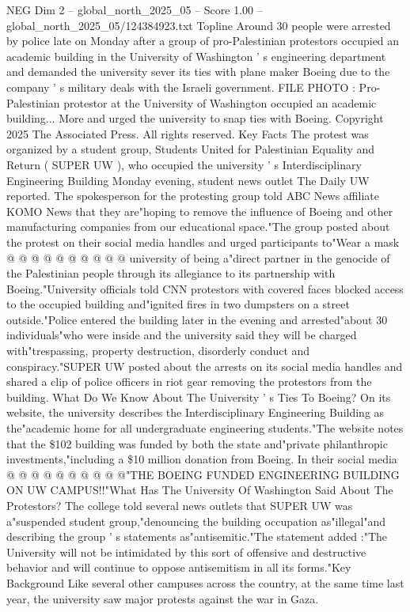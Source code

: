 \begin{textsample}{NEG Dim 2 – global\_north\_2025\_05 – Score 1.00 – global\_north\_2025\_05/124384923.txt}  \label{ex:f2_neg_237}
Topline Around 30 people were arrested by police late on Monday after a group of pro-Palestinian protestors occupied an academic building in the University of Washington ' s engineering department and demanded the university sever its ties with plane maker Boeing due to the company ' s military deals with the Israeli government.
FILE PHOTO : Pro-Palestinian protestor at the University of Washington occupied an academic building...
More and urged the university to snap ties with Boeing.
Copyright 2025 The Associated Press.
All rights reserved.
Key Facts The protest was organized by a student group, Students United for Palestinian Equality and Return ( SUPER UW ), who occupied the university ' s Interdisciplinary Engineering Building Monday evening, student news outlet The Daily UW reported.
The spokesperson for the protesting group told ABC News affiliate KOMO News that they are"hoping to remove the influence of Boeing and other manufacturing companies from our educational space."The group posted about the protest on their social media handles and urged participants to"Wear a mask @ @ @ @ @ @ @ @ @ @ university of being a"direct partner in the genocide of the Palestinian people through its allegiance to its partnership with Boeing."University officials told CNN protestors with covered faces blocked access to the occupied building and"ignited fires in two dumpsters on a street outside."Police entered the building later in the evening and arrested"about 30 individuals"who were inside and the university said they will be charged with"trespassing, property destruction, disorderly conduct and conspiracy."SUPER UW posted about the arrests on its social media handles and shared a clip of police officers in riot gear removing the protestors from the building.
What Do We Know About The University ' s Ties To Boeing?
On its website, the university describes the Interdisciplinary Engineering Building as the"academic home for all undergraduate engineering students."The website notes that the \$102 building was funded by both the state and"private philanthropic investments,"including a \$10 million donation from Boeing.
In their social media @ @ @ @ @ @ @ @ @ @"THE BOEING FUNDED ENGINEERING BUILDING ON UW CAMPUS!!"What Has The University Of Washington Said About The Protestors?
The college told several news outlets that SUPER UW was a"suspended student group,"denouncing the building occupation as"illegal"and describing the group ' s statements as"antisemitic."The statement added :"The University will not be intimidated by this sort of offensive and destructive behavior and will continue to oppose antisemitism in all its forms."Key Background Like several other campuses across the country, at the same time last year, the university saw major protests against the war in Gaza.

\end{textsample}
